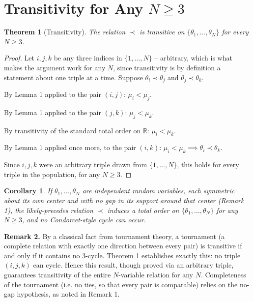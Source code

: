 \documentclass[11pt]{article}
\newtheorem{theorem}{Theorem}
\newtheorem{corollary}{Corollary}
\begin{document}
\section{Transitivity for Any $N \geq 3$}

\begin{theorem}[Transitivity]
The relation $\prec$ is transitive on $\{\theta_1, \ldots, \theta_N\}$ for every $N \geq 3$.
\end{theorem}

\begin{proof}
Let $i, j, k$ be any three indices in $\{1, \ldots, N\}$ -- arbitrary, which is what makes the argument work for any $N$, since transitivity is by definition a statement about one triple at a time. Suppose $\theta_i \prec \theta_j$ and $\theta_j \prec \theta_k$.

By Lemma 1 applied to the pair $(i, j)$: $\mu_i < \mu_j$.

By Lemma 1 applied to the pair $(j, k)$: $\mu_j < \mu_k$.

By transitivity of the standard total order on $\mathbb{R}$: $\mu_i < \mu_k$.

By Lemma 1 applied once more, to the pair $(i, k)$: $\mu_i < \mu_k \implies \theta_i \prec \theta_k$.

Since $i, j, k$ were an arbitrary triple drawn from $\{1, \ldots, N\}$, this holds for every triple in the population, for any $N \geq 3$.
\end{proof}

\begin{corollary}
If $\theta_1, \ldots, \theta_N$ are independent random variables, each symmetric about its own center and with no gap in its support around that center (Remark 1), the likely-precedes relation $\prec$ induces a total order on $\{\theta_1, \ldots, \theta_N\}$ for any $N \geq 3$, and no Condorcet-style cycle can occur.
\end{corollary}

\textbf{Remark 2.} By a classical fact from tournament theory, a tournament (a complete relation with exactly one direction between every pair) is transitive if and only if it contains no 3-cycle. Theorem 1 establishes exactly this: no triple $(i, j, k)$ can cycle. Hence this result, though proved via an arbitrary triple, guarantees transitivity of the entire $N$-variable relation for any $N$. Completeness of the tournament (i.e. no ties, so that every pair is comparable) relies on the no-gap hypothesis, as noted in Remark 1.
\end{document}
